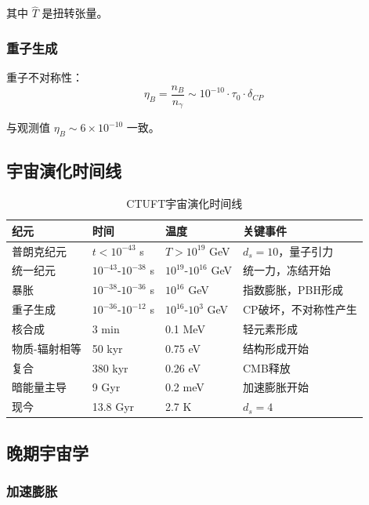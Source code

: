 其中 $\hat{T}$ 是扭转张量。

\subsubsection{重子生成}

重子不对称性：
\begin{equation}
    \eta_B = \frac{n_B}{n_\gamma} \sim 10^{-10} \cdot \tau_0 \cdot \delta_{CP}
\end{equation}

与观测值 $\eta_B \sim 6 \times 10^{-10}$ 一致。

\subsection{宇宙演化时间线}

\begin{table}[htbp]
\centering
\caption{CTUFT宇宙演化时间线}
\begin{tabular}{llll}
\hline
\textbf{纪元} & \textbf{时间} & \textbf{温度} & \textbf{关键事件} \\
\hline
普朗克纪元 & $t < 10^{-43}$ s & $T > 10^{19}$ GeV & $d_s = 10$，量子引力 \\
统一纪元 & $10^{-43}$-$10^{-38}$ s & $10^{19}$-$10^{16}$ GeV & 统一力，冻结开始 \\
暴胀 & $10^{-38}$-$10^{-36}$ s & $10^{16}$ GeV & 指数膨胀，PBH形成 \\
重子生成 & $10^{-36}$-$10^{-12}$ s & $10^{16}$-$10^3$ GeV & CP破坏，不对称性产生 \\
核合成 & 3 min & 0.1 MeV & 轻元素形成 \\
物质-辐射相等 & 50 kyr & 0.75 eV & 结构形成开始 \\
复合 & 380 kyr & 0.26 eV & CMB释放 \\
暗能量主导 & 9 Gyr & 0.2 meV & 加速膨胀开始 \\
现今 & 13.8 Gyr & 2.7 K & $d_s = 4$ \\
\hline
\end{tabular}
\end{table}

\subsection{晚期宇宙学}

\subsubsection{加速膨胀}

